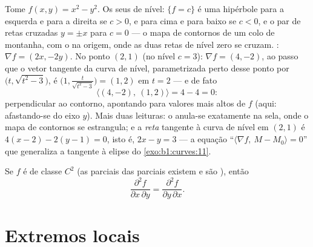\begin{example}
\label{ex:b1:multivar:levelcurves}
Tome $f(x, y) = x^2 - y^2$. Os seus  de nível: $\{f = c\}$ é uma hipérbole 
para a esquerda e para a direita se $c > 0$, e para cima e para baixo
se $c < 0$, e o par de retas cruzadas $y = \pm x$ para $c = 0$ --- o mapa de
contornos de um colo de montanha, com o  na origem, onde
as duas retas de nível zero se cruzam. : $\nabla
f = (2x, -2y)$. No ponto
$(2, 1)$ (no nível $c = 3$): $\nabla f = (4, -2)$, ao passo que o vetor tangente da
curva de nível, parametrizada perto desse ponto por $\bigl(t,
\sqrt{t^2 - 3}\bigr)$, é $\bigl(1, \frac{t}{\sqrt{t^2 -
3}}\bigr) = (1, 2)$ em
$t = 2$ --- e de fato
\[
\langle (4, -2),\ (1, 2)\rangle = 4 - 4 = 0 :
\]
 perpendicular ao contorno, apontando para valores mais altos
de $f$ (aqui: afastando-se do eixo $y$). Mais duas leituras: o
 anula-se exatamente na sela, onde o mapa de contornos se
estrangula; e a \emph{reta} tangente à curva de nível em $(2,1)$ é
$4(x - 2) - 2(y - 1) = 0$, isto é, $2x -
y = 3$ --- a equação ``$\langle \nabla f,\ M - M_0\rangle =
0$'' que generaliza a tangente
à elipse do \cref{exo:b1:curves:11}.
\end{example}

\begin{theorem}[Schwarz]\label{thm:b1:multivar:schwarz}
Se $f$ é de classe $C^2$ (as parciais das parciais existem e são
), então
\[
\frac{\partial^2 f}{\partial x\,\partial y}
= \frac{\partial^2 f}{\partial y\,\partial x} .
\]
\end{theorem}
\admitted

\section{Extremos locais}

